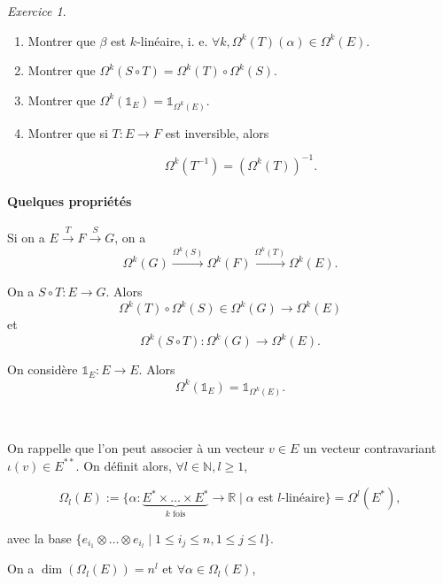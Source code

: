 \documentclass[french]{article}
\theoremstyle{definition}
\theoremstyle{remark}
\newtheorem{exo}{Exercice}
\begin{document}
\begin{exo}

  \

  \begin{enumerate}
    \item Montrer que \(\beta\) est \(k\)-linéaire, i. e. \(\forall k , \Omega ^{k}(T)(\alpha) \in \Omega ^{k}(E)\).
    \item Montrer que \(\Omega ^{k}(S \circ T) = \Omega ^{k}(T) \circ \Omega ^{k}(S)\).
    \item Montrer que \(\Omega ^{k}(\mathds{1}_{E}) = \mathds{1}_{\Omega ^{k}(E)}\).
    \item Montrer que si \(T : E \to F\) est inversible, alors

    \[\Omega ^{k}(T ^{-1} ) = (\Omega ^{k}(T)) ^{-1}. \]
  \end{enumerate}
\end{exo}

\paragraph{Quelques propriétés}

Si on a \(E \stackrel{T}{\longrightarrow} F \stackrel{S}{\longrightarrow} {G}\), on a \[\Omega ^{k}(G) \stackrel{\Omega ^{k}(S)}{\longrightarrow} \Omega ^{k}(F) \stackrel{\Omega ^{k}(T)}{\longrightarrow} \Omega ^{k}(E).\]

On a \(S \circ T : E \longrightarrow G\). Alors \[\Omega ^{k}(T) \circ \Omega ^{k}(S) \in \Omega ^{k}(G) \longrightarrow \Omega ^{k}(E)\] et \[\Omega ^{k}(S \circ T) : \Omega ^{k}(G) \longrightarrow \Omega ^{k}(E).\]

On considère \(\mathds{1}_{E} : E \to E\). Alors \[\Omega ^{k}(\mathds{1}_{E}) = \mathds{1}_{\Omega ^{k}(E)}.\]

\

On rappelle que l'on peut associer à un vecteur \(v \in E\) un vecteur contravariant \( \iota(v) \in E ^{**}\). On définit alors, \(\forall l \in \mathbb{N}, l \geq  1\),

\[\Omega _{l}(E) := \{ \alpha : \underbrace{E ^{*} \times \dots \times E ^{*}}_{k \text{ fois} } \to \mathbb{R} \mid \alpha \text{ est } l\text{-linéaire}\} = \Omega ^{l}(E ^{*}), \]

avec la base \(\{ e _{i_1} \otimes \dots \otimes e _{i_l} \mid 1 \leq i_j \leq  n, 1 \leq j \leq l \}\).

On a \(\operatorname{dim}(\Omega_{l}(E)) = n ^{l}\) et \( \forall \alpha \in \Omega _{l}(E)\),
\end{document}
